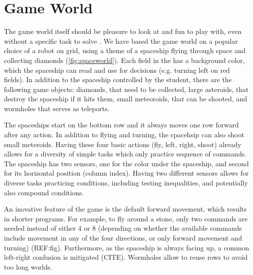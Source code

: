 

\section{Game World}  %
\label{sec:robomission.game-world}

The game world itself should be pleasure to look at and fun to play with,
even without a specific task to solve \cite{book-of-lenses}.
We have based the game world on a popular choice of a robot on grid,
using a theme of a spaceship flying through space and collecting diamonds
(\cref{fig:spaceworld}).
Each field in the  has a background color, which
the spaceship can read and use for decisions (e.g. turning left on red fields).
In addition to the spaceship controlled by the student,
there are the following game objects:
diamonds, that need to be collected,
large asteroids, that destroy the spaceship if it hits them,
small meteoroids, that can be shooted,
and wormholes that serves as teleports.

The spaceships start on the bottom row and it always moves one row forward
after any action. %
In addition to flying and turning, the spacehsip can also shoot small meteroids.
Having these four basic actions (fly, left, right, shoot) already allows for a
diversity of simple tasks which only practice sequence of commands.
The spaceship has two sensors, one for the color under the spaceship, and
second for its horizontal position (column index). Having two different sensors allows
for diverse tasks practicing conditions, including testing inequalities, and
potentially also compound conditions.

An inovative feature of the game is the default forward movement,
which results in shorter programs.
For example, to fly around a stone, only two commands are needed %
instead of either 4 or 8 (depending on whether the available commands include
movement in any of the four directions, or only forward movement and turning)
(REF:fig).
Furthermore, as the spaceship is always facing up, a common left-right
confusion is mitigated (CITE).
Wormholes allow to reuse rows to avoid too long worlds.  %


